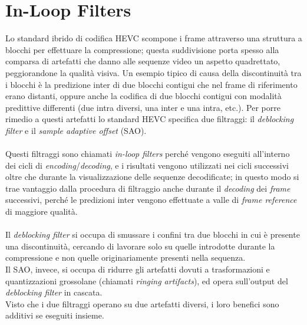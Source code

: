\section{In-Loop Filters}
Lo standard ibrido di codifica HEVC scompone i frame attraverso una struttura a 
blocchi per effettuare la compressione; questa suddivisione porta spesso alla 
comparsa di artefatti che danno alle sequenze video un aspetto quadrettato, 
peggiorandone la qualità visiva. Un esempio tipico di causa della discontinuità 
tra i blocchi è la predizione inter di due blocchi contigui che nel frame
 di riferimento erano distanti, oppure anche la codifica di due blocchi contigui
 con modalità predittive differenti (due intra diversi, una inter e una intra, 
etc.). Per porre rimedio a questi artefatti lo standard HEVC specifica due 
filtraggi: il \emph{deblocking filter} e il \emph{sample adaptive offset} (SAO).
\\ \\
Questi filtraggi sono chiamati \emph{in-loop filters} perché vengono eseguiti 
all'interno dei cicli di \textit{encoding}/\textit{decoding}, e i risultati 
vengono utilizzati nei cicli successivi oltre che durante la visualizzazione 
delle sequenze decodificate; in questo modo si trae vantaggio dalla procedura 
di filtraggio anche durante il \textit{decoding} dei \textit{frame} successivi, 
perché le predizioni inter vengono effettuate a valle di \textit{frame 
reference} di maggiore qualità.
\\ \\
Il \emph{deblocking filter} si occupa di smussare i confini tra due blocchi in 
cui è presente una discontinuità, cercando di lavorare solo su quelle 
introdotte durante la compressione e non quelle originariamente presenti nella 
sequenza. \\
Il SAO, invece, si occupa di ridurre gli artefatti dovuti a trasformazioni e 
quantizzazioni grossolane (chiamati \emph{ringing artifacts}), ed opera 
sull'output del \emph{deblocking filter} in cascata. \\
Visto che i due filtraggi operano su due artefatti diversi, i loro benefici 
sono additivi se eseguiti insieme.


